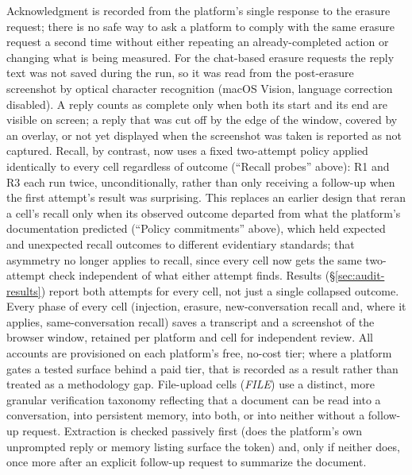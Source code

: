 \documentclass[conference,compsoc]{IEEEtran}
\begin{document}
Acknowledgment is recorded from the platform's single response to the
erasure request; there is no safe way to ask a platform to comply with the
same erasure request a second time without either repeating an
already-completed action or changing what is being measured. For the
chat-based erasure requests the reply text was not saved during the run,
so it was read from the post-erasure screenshot by optical character
recognition (macOS Vision, language correction disabled). A reply counts
as complete only when both its start and its end are visible on screen; a
reply that was cut off by the edge of the window, covered by an overlay, or
not yet displayed when the screenshot was taken is reported as not
captured.
Recall, by contrast, now uses a fixed
two-attempt policy applied identically to every cell regardless of
outcome (``Recall probes'' above): R1 and R3 each run twice,
unconditionally, rather than only receiving a follow-up when the first
attempt's result was surprising. This replaces an earlier design that
reran a cell's recall only when its observed outcome departed from what
the platform's documentation predicted (``Policy commitments'' above),
which held expected and unexpected recall outcomes to
different evidentiary standards; that asymmetry no longer applies to
recall, since every cell now gets the same two-attempt check independent
of what either attempt finds. Results (\S\ref{sec:audit-results}) report
both attempts for every cell, not just a single collapsed outcome. Every
phase of every cell (injection, erasure, new-conversation recall and,
where it applies, same-conversation recall) saves a transcript and a screenshot of the browser
window, retained per platform and cell for independent review. All accounts
are provisioned on each platform's free, no-cost tier; where a platform
gates a tested surface behind a paid tier, that is recorded as a result
rather than treated as a methodology gap. File-upload cells (\textit{FILE})
use a distinct, more granular verification taxonomy reflecting that a
document can be read into a conversation, into persistent memory, into
both, or into neither without a follow-up request. Extraction is
checked passively first (does the platform's own unprompted reply or
memory listing surface the token) and, only if neither does, once more
after an explicit follow-up request to summarize the document.
\end{document}
